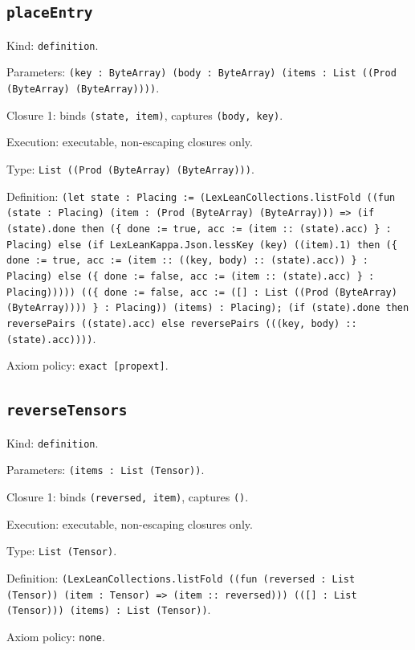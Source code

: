 \documentclass[11pt]{article}
\begin{document}
\subsection*{\texttt{placeEntry}}
\noindent Kind: \texttt{definition}.\par
\noindent Parameters: \texttt{(key : ByteArray) (body : ByteArray) (items : List ((Prod (ByteArray) (ByteArray))))}.\par
\noindent Closure 1: binds \texttt{(state, item)}, captures \texttt{(body, key)}.\par
\noindent Execution: executable, non-escaping closures only.\par
\noindent Type: \texttt{List ((Prod (ByteArray) (ByteArray)))}.\par
\noindent Definition: \texttt{(let state : Placing := (LexLeanCollections.listFold ((fun (state : Placing) (item : (Prod (ByteArray) (ByteArray))) => (if (state).done then (\{ done := true, acc := (item :: (state).acc) \} : Placing) else (if LexLeanKappa.Json.lessKey (key) ((item).1) then (\{ done := true, acc := (item :: ((key, body) :: (state).acc)) \} : Placing) else (\{ done := false, acc := (item :: (state).acc) \} : Placing))))) ((\{ done := false, acc := ([] : List ((Prod (ByteArray) (ByteArray)))) \} : Placing)) (items) : Placing); (if (state).done then reversePairs ((state).acc) else reversePairs (((key, body) :: (state).acc))))}.\par
\noindent Axiom policy: \texttt{exact [propext]}.\par
\subsection*{\texttt{reverseTensors}}
\noindent Kind: \texttt{definition}.\par
\noindent Parameters: \texttt{(items : List (Tensor))}.\par
\noindent Closure 1: binds \texttt{(reversed, item)}, captures \texttt{()}.\par
\noindent Execution: executable, non-escaping closures only.\par
\noindent Type: \texttt{List (Tensor)}.\par
\noindent Definition: \texttt{(LexLeanCollections.listFold ((fun (reversed : List (Tensor)) (item : Tensor) => (item :: reversed))) (([] : List (Tensor))) (items) : List (Tensor))}.\par
\noindent Axiom policy: \texttt{none}.\par
\end{document}
